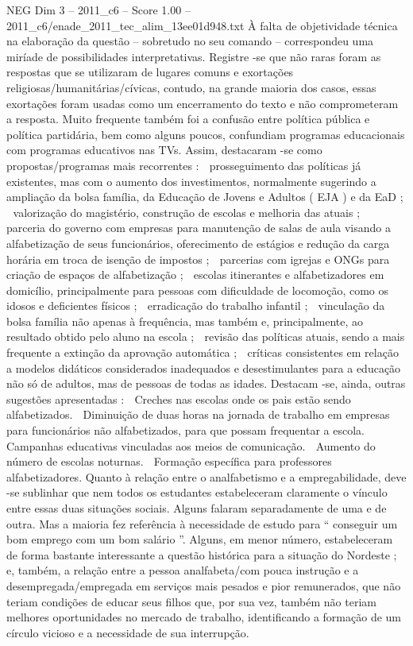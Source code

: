 \begin{textsample}{NEG Dim 3 – 2011\_c6 – Score 1.00 – 2011\_c6/enade\_2011\_tec\_alim\_13ee01d948.txt}
À falta de objetividade técnica na elaboração da questão – sobretudo no seu comando – correspondeu uma miríade de possibilidades interpretativas.
Registre -se que não raras foram as respostas que se utilizaram de lugares comuns e exortações religiosas/humanitárias/cívicas, contudo, na grande maioria dos casos, essas exortações foram usadas como um encerramento do texto e não comprometeram a resposta.
Muito frequente também foi a confusão entre política pública e política partidária, bem como alguns poucos, confundiam programas educacionais com programas educativos nas TVs.
Assim, destacaram -se como propostas/programas mais recorrentes :  prosseguimento das políticas já existentes, mas com o aumento dos investimentos, normalmente sugerindo a ampliação da bolsa família, da Educação de Jovens e Adultos ( EJA ) e da EaD ;  valorização do magistério, construção de escolas e melhoria das atuais ;  parceria do governo com empresas para manutenção de salas de aula visando a alfabetização de seus funcionários, oferecimento de estágios e redução da carga horária em troca de isenção de impostos ;  parcerias com igrejas e ONGs para criação de espaços de alfabetização ;  escolas itinerantes e alfabetizadores em domicílio, principalmente para pessoas com dificuldade de locomoção, como os idosos e deficientes físicos ;  erradicação do trabalho infantil ;  vinculação da bolsa família não apenas à frequência, mas também e, principalmente, ao resultado obtido pelo aluno na escola ;  revisão das políticas atuais, sendo a mais frequente a extinção da aprovação automática ;  críticas consistentes em relação a modelos didáticos considerados inadequados e desestimulantes para a educação não só de adultos, mas de pessoas de todas as idades.
Destacam -se, ainda, outras sugestões apresentadas :  Creches nas escolas onde os pais estão sendo alfabetizados.  Diminuição de duas horas na jornada de trabalho em empresas para funcionários não alfabetizados, para que possam frequentar a escola.  Campanhas educativas vinculadas aos meios de comunicação.  Aumento do número de escolas noturnas.  Formação específica para professores alfabetizadores.
Quanto à relação entre o analfabetismo e a empregabilidade, deve -se sublinhar que nem todos os estudantes estabeleceram claramente o vínculo entre essas duas situações sociais.
Alguns falaram separadamente de uma e de outra.
Mas a maioria fez referência à necessidade de estudo para “ conseguir um bom emprego com um bom salário ”.
Alguns, em menor número, estabeleceram de forma bastante interessante a questão histórica para a situação do Nordeste ; e, também, a relação entre a pessoa analfabeta/com pouca instrução e a desempregada/empregada em serviços mais pesados e pior remunerados, que não teriam condições de educar seus filhos que, por sua vez, também não teriam melhores oportunidades no mercado de trabalho, identificando a formação de um círculo vicioso e a necessidade de sua interrupção.

\end{textsample}
